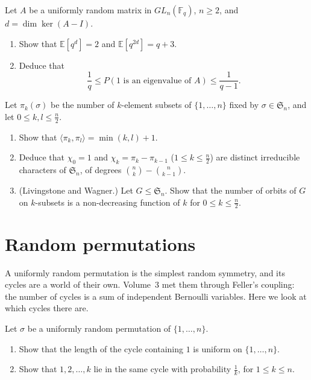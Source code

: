\begin{exercise}[$\star\star$]\label{pb:glfix}
Let $A$ be a uniformly random matrix in $GL_n(\mathbb F_q)$, $n\ge2$, and $d=\dim\ker(A-I)$.
\begin{enumerate}[label=(\alph*)]
\item Show that $\mathbb E[q^d]=2$ and $\mathbb E[q^{2d}]=q+3$.
\item Deduce that
\[
\frac1q\le P(1\text{ is an eigenvalue of }A)\le\frac1{q-1}.
\]
\end{enumerate}
\end{exercise}

\begin{exercise}[$\star\star\star$]\label{pb:ksubsets}
Let $\pi_k(\sigma)$ be the number of $k$-element subsets of $\{1,\dots,n\}$ fixed by $\sigma\in\mathfrak S_n$, and let
$0\le k,l\le\frac n2$.
\begin{enumerate}[label=(\alph*)]
\item Show that $\langle\pi_k,\pi_l\rangle=\min(k,l)+1$.
\item Deduce that $\chi_0=1$ and $\chi_k=\pi_k-\pi_{k-1}$ ($1\le k\le\frac n2$) are distinct irreducible characters of
$\mathfrak S_n$, of degrees $\binom nk-\binom n{k-1}$.
\item (Livingstone and Wagner.) Let $G\le\mathfrak S_n$. Show that the number of orbits of $G$ on $k$-subsets is a
non-decreasing function of $k$ for $0\le k\le\frac n2$.
\end{enumerate}
\end{exercise}

\section{Random permutations}

A uniformly random permutation is the simplest random symmetry, and its cycles are a world of their own. Volume~3 met them
through Feller's coupling: the number of cycles is a sum of independent Bernoulli variables. Here we look at which cycles
there are.

\begin{exercise}[$\star$]\label{pb:samecycle}
Let $\sigma$ be a uniformly random permutation of $\{1,\dots,n\}$.
\begin{enumerate}[label=(\alph*)]
\item Show that the length of the cycle containing $1$ is uniform on $\{1,\dots,n\}$.
\item Show that $1,2,\dots,k$ lie in the same cycle with probability $\frac1k$, for $1\le k\le n$.
\end{enumerate}
\end{exercise}

